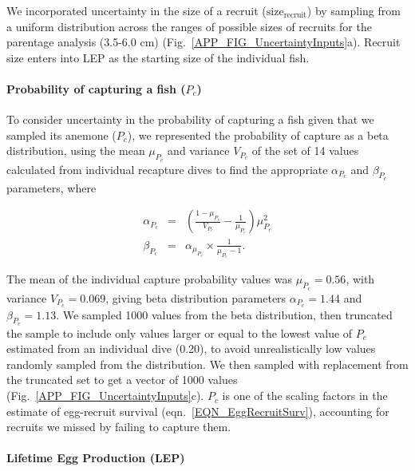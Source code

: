 \documentclass[12pt, oneside]{article}   	%
\begin{document}
We incorporated uncertainty in the size of a recruit ($\text{size}_\text{recruit}$) by sampling from a uniform distribution across the ranges of possible sizes of recruits for the parentage analysis (3.5-6.0 cm) (Fig.\ \ref{APP_FIG_UncertaintyInputs}a). Recruit size enters into LEP as the starting size of the individual fish.

\paragraph*{Probability of capturing a fish ($P_c$)} %

To consider uncertainty in the probability of capturing a fish given that we sampled its anemone ($P_c$), we represented the probability of capture as a beta distribution, using the mean $\mu_{P_c}$ and variance $V_{P_c}$ of the set of 14 values calculated from individual recapture dives to find the appropriate $\alpha_{P_c}$ and $\beta_{P_c}$ parameters, where 

\begin{eqnarray}
\alpha_{P_c} &=& (\frac{1-\mu_{P_c}}{V_{P_c}} - \frac{1}{\mu_{P_c}}) \mu_{P_c}^2 \\
\beta_{P_c} &=& \alpha_{\mu_{P_c}} \times \frac{1}{\mu_{P_c} - 1}. \label{APP_EQN_ProbCapBetaDistParams}  %
\end{eqnarray}

The mean of the individual capture probability values was $\mu_{P_c} = 0.56$, with variance $V_{P_c} = 0.069$, giving beta distribution parameters $\alpha_{P_c} = 1.44$ and $\beta_{P_c} = 1.13$. We sampled 1000 values from the beta distribution, then truncated the sample to include only values larger or equal to the lowest value of $P_c$ estimated from an individual dive (0.20), to avoid unrealistically low values randomly sampled from the distribution. We then sampled with replacement from the truncated set to get a vector of 1000 values (Fig.\ \ref{APP_FIG_UncertaintyInputs}c). $P_c$ is one of the scaling factors in the estimate of egg-recruit survival (eqn.\ \ref{EQN_EggRecruitSurv}), accounting for recruits we missed by failing to capture them.

\paragraph*{Lifetime Egg Production (LEP)} %
\end{document}
